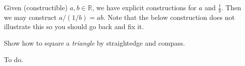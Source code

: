 \documentclass[../../master.tex]{subfiles}
\begin{document}
\begin{solution}
    Given (constructible) $a, b \in \mathbb{R}$, we have explicit constructions for $a$ and $\frac{1}{b}$.
    Then we may construct $a / (1/b) = ab$.
    Note that the below construction does not illustrate this so you should go back and fix it.
    
    \begin{center}
    \end{center}
\end{solution}

\begin{problem}
    Show how to square a \textit{triangle} by straightedge and compass.
\end{problem}

\begin{solution}
    To do.
\end{solution}
\end{document}
